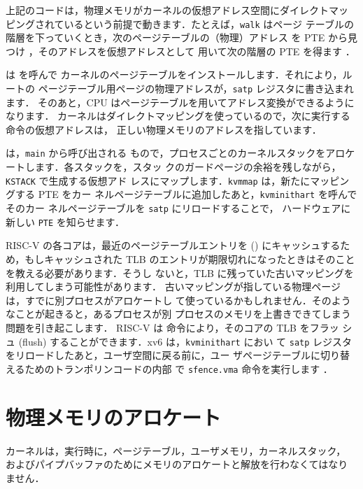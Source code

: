 上記のコードは，物理メモリがカーネルの仮想アドレス空間にダイレクトマッ
ピングされているという前提で動きます．たとえば，\texttt{walk} はページ
テーブルの階層を下っていくとき，次のページテーブルの（物理）アドレス
を PTE から見つけ ，そのアドレスを仮想アドレスとして
用いて次の階層の PTE を得ます ．

 は  
を呼んで
カーネルのページテーブルをインストールします．それにより，ルートの
ページテーブル用ページの物理アドレスが，\texttt{satp} レジスタに書き込まれます．
そのあと，CPU はページテーブルを用いてアドレス変換ができるようになります．
カーネルはダイレクトマッピングを使っているので，次に実行する命令の仮想アドレスは，
正しい物理メモリのアドレスを指しています．

  は，\lstinline{main} から呼び出される
もので，プロセスごとのカーネルスタックをアロケートします．各スタックを，スタッ
クのガードページの余裕を残しながら，\lstinline{KSTACK} で生成する仮想アド
レスにマップします．\lstinline{kvmmap} は，新たにマッピングする PTE をカー
ネルページテーブルに追加したあと，\lstinline{kvminithart} を呼んでそのカー
ネルページテーブルを \lstinline{satp} にリロードすることで，
ハードウェアに新しい \lstinline{PTE} を知らせます．

RISC-V の各コアは，最近のページテーブルエントリを 
 () にキャッシュするため，もしキャッシュされた TLB
のエントリが期限切れになったときはそのことを教える必要があります．そうし
ないと，TLB に残っていた古いマッピングを利用してしまう可能性があります．
古いマッピングが指している物理ページは，すでに別プロセスがアロケートし
て使っているかもしれません．そのようなことが起きると，あるプロセスが別
プロセスのメモリを上書きできてしまう問題を引き起こします．
RISC-V は  命令により，そのコアの TLB をフラッ
シュ (flush) することができます．xv6 は，\texttt{kvminithart} におい
て \texttt{satp} レジスタをリロードしたあと，ユーザ空間に戻る前に，ユー
ザページテーブルに切り替えるためのトランポリンコードの内部
で \texttt{sfence.vma} 命令を実行します ．

\section{物理メモリのアロケート}

カーネルは，実行時に，ページテーブル，ユーザメモリ，カーネルスタック，
およびパイプバッファのためにメモリのアロケートと解放を行わなくてはなり
ません．

